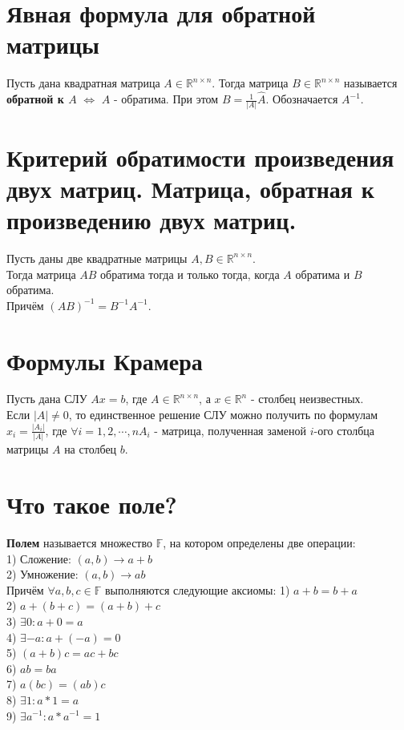 \documentclass[a4paper,11pt]{report}
\begin{document}
\section{Явная формула для обратной матрицы}
Пусть дана квадратная матрица $A \in \mathbb{R}^{n\times{n}}$. Тогда матрица $B \in \mathbb{R}^{n\times{n}}$ называется
\textbf{обратной к $A$} $\Leftrightarrow$ $A$ - обратима. При этом $B = \frac{1}{|A|}\hat{A}$. Обозначается $A^{-1}$.
\section{Критерий обратимости произведения двух матриц. Матрица, обратная к произведению двух матриц.}
Пусть даны две квадратные матрицы $A, B \in \mathbb{R}^{n\times{n}}$.\\
Тогда матрица $AB$ обратима тогда и только тогда, когда $A$ обратима и $B$ обратима.\\
Причём $(AB)^{-1} = B^{-1}A^{-1}$.\\
\section{Формулы Крамера}
Пусть дана СЛУ $Ax = b$, где $A \in \mathbb{R}^{n\times{n}}$, а $x \in \mathbb{R}^n$ - столбец неизвестных.\\
Если $|A| \neq 0$, то единственное решение СЛУ можно получить по формулам $x_i = \frac{|A_i|}{|A|}$, где
$\forall i = 1, 2, \cdots, n A_i$ - матрица, полученная заменой $i$-ого столбца матрицы $A$ на столбец $b$.
\section{Что такое поле?}
\textbf{Полем} называется множество $\mathbb{F}$, на котором определены две операции:\\
1) Сложение: $(a, b) \longrightarrow a + b$\\
2) Умножение: $(a, b) \longrightarrow ab$\\
Причём $\forall a, b, c \in \mathbb{F}$ выполняются следующие аксиомы:
1) $a + b = b + a$\\
2) $a + (b + c) = (a + b) + c$\\
3) $\exists 0: a + 0 = a$\\
4) $\exists -a: a + (-a) = 0$\\
5) $(a + b)c = ac + bc$\\
6) $ab = ba$\\
7) $a(bc) = (ab)c$\\
8) $\exists 1: a * 1 = a$\\
9) $\exists a^{-1}: a * a^{-1} = 1$\\
\\
\end{document}
